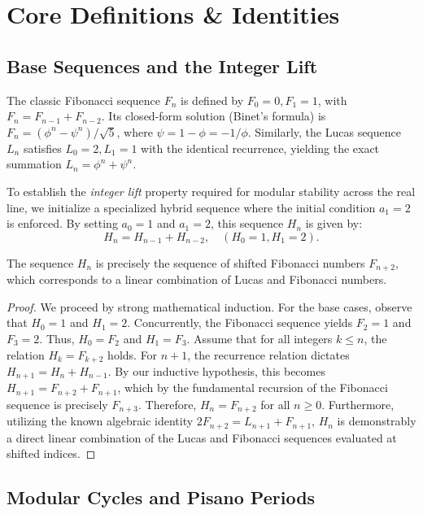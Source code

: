 \section{Core Definitions \& Identities}

\subsection{Base Sequences and the Integer Lift}

The classic Fibonacci sequence $F_n$ is defined by $F_0 = 0, F_1 = 1$, with $F_n = F_{n-1} + F_{n-2}$. Its closed-form solution (Binet's formula) is $F_n = (\phi^n - \psi^n)/\sqrt{5}$, where $\psi = 1 - \phi = -1/\phi$. Similarly, the Lucas sequence $L_n$ satisfies $L_0 = 2, L_1 = 1$ with the identical recurrence, yielding the exact summation $L_n = \phi^n + \psi^n$.

To establish the \textit{integer lift} property required for modular stability across the real line, we initialize a specialized hybrid sequence where the initial condition $a_1 = 2$ is enforced. By setting $a_0 = 1$ and $a_1 = 2$, this sequence $H_n$ is given by:
\[
	H_n = H_{n-1} + H_{n-2}, \quad (H_0 = 1, H_1 = 2).
\]
\begin{proposition}
	The sequence $H_n$ is precisely the sequence of shifted Fibonacci numbers $F_{n+2}$, which corresponds to a linear combination of Lucas and Fibonacci numbers.
\end{proposition}
\begin{proof}
	We proceed by strong mathematical induction. For the base cases, observe that $H_0 = 1$ and $H_1 = 2$. Concurrently, the Fibonacci sequence yields $F_2 = 1$ and $F_3 = 2$. Thus, $H_0 = F_2$ and $H_1 = F_3$. Assume that for all integers $k \le n$, the relation $H_k = F_{k+2}$ holds. For $n+1$, the recurrence relation dictates $H_{n+1} = H_n + H_{n-1}$. By our inductive hypothesis, this becomes $H_{n+1} = F_{n+2} + F_{n+1}$, which by the fundamental recursion of the Fibonacci sequence is precisely $F_{n+3}$. Therefore, $H_n = F_{n+2}$ for all $n \ge 0$. Furthermore, utilizing the known algebraic identity $2F_{n+2} = L_{n+1} + F_{n+1}$, $H_n$ is demonstrably a direct linear combination of the Lucas and Fibonacci sequences evaluated at shifted indices.
\end{proof}

\subsection{Modular Cycles and Pisano Periods}

